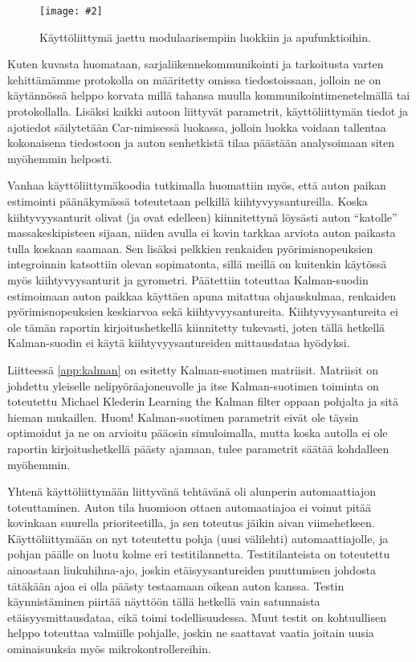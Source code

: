 \documentclass{article}
\newcommand{\kuvaa}[4]{%
	\begin{figure}[h]%
		\centering \texttt{[image: \#2]}%
		\caption{#3 \label{fig:#4}}%
	\end{figure}%
}
\begin{document}
\kuvaa{0.8}{gui_tiedostolistaus}{Käyttöliittymä jaettu modulaarisempiin luokkiin ja apufunktioihin.}{guitiedostot}

Kuten kuvasta huomataan, sarjaliikennekommunikointi ja tarkoitusta varten kehittämämme protokolla on määritetty omissa tiedostoissaan, jolloin ne on käytännössä helppo korvata millä tahansa muulla kommunikointimenetelmällä tai protokollalla. Lisäksi kaikki autoon liittyvät parametrit, käyttöliittymän tiedot ja ajotiedot säilytetään Car-nimisessä luokassa, jolloin luokka voidaan tallentaa kokonaisena tiedostoon ja auton senhetkistä tilaa päästään analysoimaan siten myöhemmin helposti.

Vanhaa käyttöliittymäkoodia tutkimalla huomattiin myös, että auton paikan estimointi päänäkymässä toteutetaan pelkillä kiihtyvyysantureilla. Koska kiihtyvyysanturit olivat (ja ovat edelleen) kiinnitettynä löysästi auton ``katolle'' massakeskipisteen sijaan, niiden avulla ei kovin tarkkaa arviota auton paikasta tulla koskaan saamaan. Sen lisäksi pelkkien renkaiden pyörimisnopeuksien integroinnin katsottiin olevan sopimatonta, sillä meillä on kuitenkin käytössä myös kiihtyvyysanturit ja gyrometri. Päätettiin toteuttaa Kalman-suodin estimoimaan auton paikkaa käyttäen apuna mitattua ohjauskulmaa, renkaiden pyörimisnopeuksien keskiarvoa sekä kiihtyvyysantureita. Kiihtyvyysantureita ei ole tämän raportin kirjoitushetkellä kiinnitetty tukevasti, joten tällä hetkellä Kalman-suodin ei käytä kiihtyvyysantureiden mittausdataa hyödyksi.

Liitteessä \ref{app:kalman} on esitetty Kalman-suotimen matriisit. Matriisit on johdettu yleiselle nelipyöräajoneuvolle ja itse Kalman-suotimen toiminta on toteutettu Michael Klederin Learning the Kalman filter \cite{bib:kalman} oppaan pohjalta ja sitä hieman mukaillen. Huom! Kalman-suotimen parametrit eivät ole täysin optimoidut ja ne on arvioitu pääosin simuloimalla, mutta koska autolla ei ole raportin kirjoitushetkellä päästy ajamaan, tulee parametrit säätää kohdalleen myöhemmin.

Yhtenä käyttöliittymään liittyvänä tehtävänä oli alunperin automaattiajon toteuttaminen. Auton tila huomioon ottaen automaatiajoa ei voinut pitää kovinkaan suurella prioriteetilla, ja sen toteutus jäikin aivan viimehetkeen. Käyttöliittymään on nyt toteutettu pohja (uusi välilehti) automaattiajolle, ja pohjan päälle on luotu kolme eri testitilannetta. Testitilanteista on toteutettu ainoastaan liukuhihna-ajo, joskin etäisyysantureiden puuttumisen johdosta tätäkään ajoa ei olla päästy testaamaan oikean auton kanssa. Testin käynnistäminen piirtää näyttöön tällä hetkellä vain satunnaista etäisyysmittausdataa, eikä toimi todellisuudessa. Muut testit on kohtuullisen helppo toteuttaa valmiille pohjalle, joskin ne saattavat vaatia joitain uusia ominaisuuksia myös mikrokontrollereihin.
\end{document}
